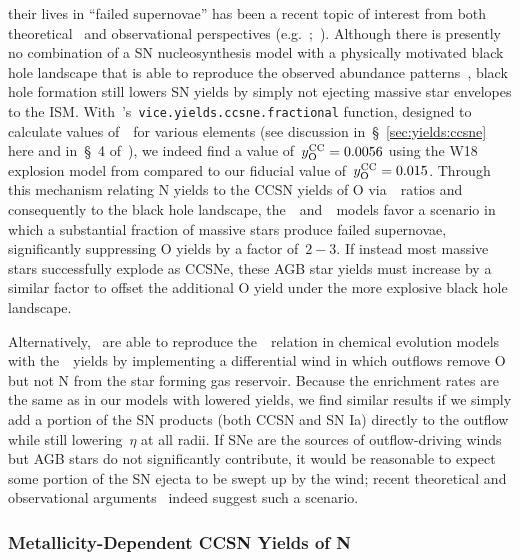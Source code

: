 \documentclass[ms.tex]{subfiles}
\begin{document}
their lives in ``failed supernovae'' has been a recent topic of interest from
both theoretical~\citep[e.g.][]{Pejcha2015, Sukhbold2016, Ertl2016} and
observational perspectives (e.g.~\citealp*{Gerke2015};~\citealp{Adams2017,
Basinger2021}).
Although there is presently no combination of a SN nucleosynthesis model with
a physically motivated black hole landscape that is able to reproduce the
observed abundance patterns~\citep{Griffith2021a}, black hole formation still
lowers SN yields by simply not ejecting massive star envelopes to the ISM.
With~\vice's~\texttt{vice.yields.ccsne.fractional} function, designed to
calculate values of~~for various elements (see discussion
in~\S~\ref{sec:yields:ccsne} here and in~\S~4 of~\citealp{Griffith2021a}), we
indeed find a value of~$y_\text{O}^\text{CC} = 0.0056$ using the W18 explosion model from
\citet{Sukhbold2016} compared to our fiducial value of~$y_\text{O}^\text{CC} = 0.015$.
Through this mechanism relating N yields to the CCSN yields of O via~\no~ratios
and consequently to the black hole landscape, the~\cristallo~and~\ventura~models
favor a scenario in which a substantial fraction of massive stars produce
failed supernovae, significantly suppressing O yields by a factor of~$2 - 3$.
If instead most massive stars successfully explode as CCSNe, these AGB star
yields must increase by a similar factor to offset the additional O yield under
the more explosive black hole landscape.
\par
Alternatively,~\citet{Vincenzo2016a} are able to reproduce the~\ohno~relation
in chemical evolution models with the~\ventura~yields by implementing a
differential wind in which outflows remove O but not N from the star forming
gas reservoir.
Because the enrichment rates are the same as in our models with lowered
yields, we find similar results if we simply add a portion of the SN products
(both CCSN and SN Ia) directly to the outflow while still lowering~$\eta$ at
all radii.
If SNe are the sources of outflow-driving winds but AGB stars do not
significantly contribute, it would be reasonable to expect some portion of
the SN ejecta to be swept up by the wind; recent theoretical
\citep{Christensen2018} and observational arguments~\citep*{Chisholm2018}
indeed suggest such a scenario.

\subsubsection{Metallicity-Dependent CCSN Yields of N}
\label{sec:results:yields:yncc}
\end{document}
